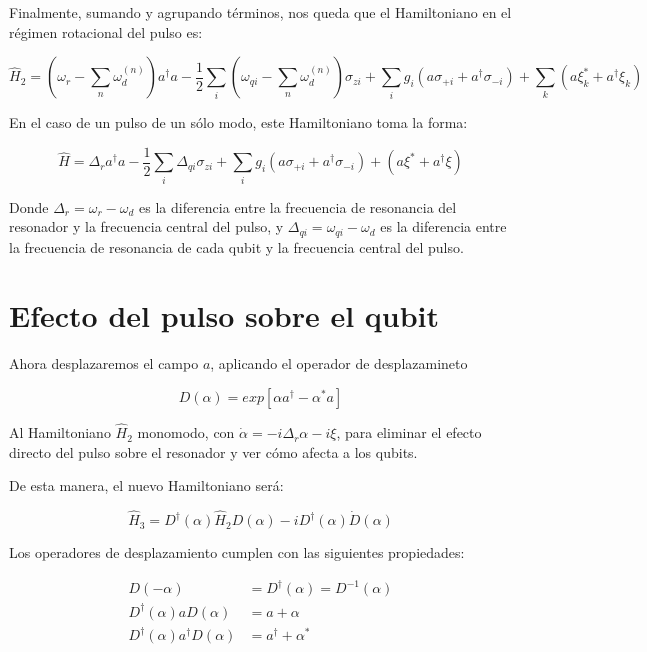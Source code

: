 Finalmente, sumando y agrupando términos, nos queda que el Hamiltoniano en el régimen rotacional del pulso es:

\begin{equation}
    \hat{H}_2 = (\omega_r - \sum\limits_n \omega_d^{(n)}) a^\dag a - \frac{1}{2} \sum\limits_i (\omega_{qi} - \sum\limits_n \omega_d^{(n)}) \sigma_{zi} + \sum\limits_i g_i (a \sigma_{+ i} + a^\dagger \sigma_{- i}) + \sum\limits_k (a\xi_k^* + a^\dagger\xi_k)
\end{equation}

En el caso de un pulso de un sólo modo, este Hamiltoniano toma la forma:

\begin{equation}
    \hat{H} = \Delta_r a^\dagger a - \frac{1}{2} \sum\limits_i \Delta_{qi} \sigma_{zi} + \sum\limits_i g_i (a \sigma_{+ i} + a^\dagger \sigma_{- i}) + (a\xi^*+a^\dagger\xi )
\end{equation}

Donde $\Delta_r = \omega_r - \omega_d$ es la diferencia entre la frecuencia de resonancia del resonador y la frecuencia central del pulso, y $\Delta_{qi} = \omega_{qi} - \omega_d$ es la diferencia entre la frecuencia de resonancia de cada qubit y la frecuencia central del pulso.

\section{Efecto del pulso sobre el qubit}

Ahora desplazaremos el campo $a$, aplicando el operador de desplazamineto

\begin{equation}
    D(\alpha) = exp[\alpha a^\dagger - \alpha^* a]
\end{equation}

Al Hamiltoniano $\hat{H}_2$ monomodo, con $\dot{\alpha} = -i \Delta_r \alpha -i \xi$, para eliminar el efecto directo del pulso sobre el resonador y ver cómo afecta a los qubits.

De esta manera, el nuevo Hamiltoniano será:

\begin{equation}
    \hat{H}_3 = D^\dagger (\alpha) \hat{H}_2 D(\alpha) -i D^\dagger(\alpha) \dot{D}(\alpha)
\end{equation}

Los operadores de desplazamiento cumplen con las siguientes propiedades:

\begin{align}
    D(-\alpha) &= D^\dagger(\alpha) = D^{-1}(\alpha) \\
    D^\dagger(\alpha) a D(\alpha) &= a + \alpha \\
    D^\dagger(\alpha) a^\dagger D(\alpha) &= a^\dagger + \alpha^*
\end{align}

